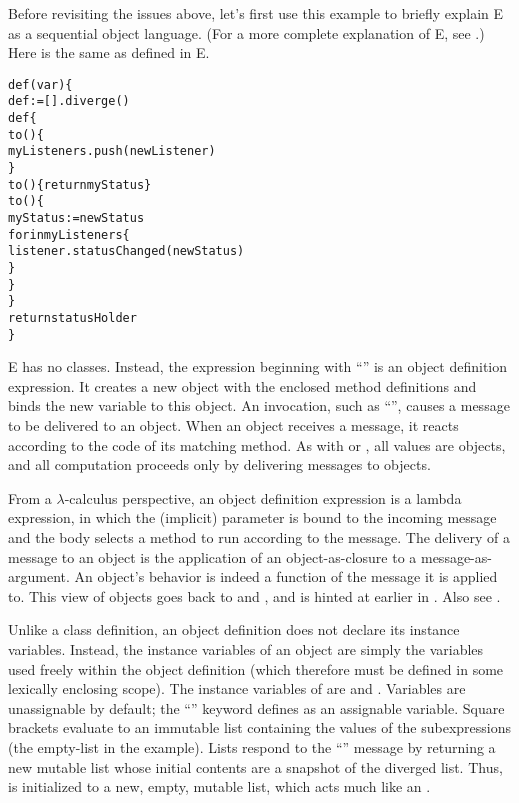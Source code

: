 \documentclass{llncs}
\begin{document}
Before revisiting the issues above, let's first use this example to
briefly explain E as a sequential object language. (For a more
complete explanation of E, see \cite{stiegler:ewalnut}.)  Here is the
same  as defined in E.
%
\begin{alltt}
    def (var ) \{
        def  := [].diverge()
        def  \{
            to () \{
                myListeners.push(newListener)
            \}
            to () \{ return myStatus \}
            to () \{
                myStatus := newStatus
                for  in myListeners \{
                    listener.statusChanged(newStatus)
                \}
            \}
        \}
        return statusHolder
    \}
\end{alltt}
%
E has no classes. Instead, the expression beginning with ``'' is an object definition expression. It creates
a new object with the enclosed method definitions and binds the new
 variable to this object. An invocation, such as
``'', causes a message to be
delivered to an object. When an object receives a message, it reacts
according to the code of its matching method. As with 
\cite{goldberg:purplebook} or  \cite{hewitt:actors}, all
values are objects, and all computation proceeds only by delivering
messages to objects.

 From a $\lambda$-calculus perspective, an object definition
expression is a lambda expression, in which the (implicit) parameter
is bound to the incoming message and the body selects a method to run
according to the message. The delivery of a message to an object is
the application of an object-as-closure to a message-as-argument. An
object's behavior is indeed a function of the message it is applied
to. This view of objects goes back to 
\cite{goldberg:smalltalk72} and , and is hinted at earlier
in \cite{hoare65}. Also see \cite{shroff:match}.

Unlike a class definition, an object definition does not declare its
instance variables. Instead, the instance variables of an object are
simply the variables used freely within the object definition (which
therefore must be defined in some lexically enclosing scope). The
instance variables of  are  and
.  Variables are unassignable by default; the
``'' keyword defines  as an assignable
variable. Square brackets evaluate to an immutable list containing the
values of the subexpressions (the empty-list in the example). Lists
respond to the ``'' message by returning a new mutable
list whose initial contents are a snapshot of the diverged list. Thus,
 is initialized to a new, empty, mutable list, which
acts much like an .
\end{document}
